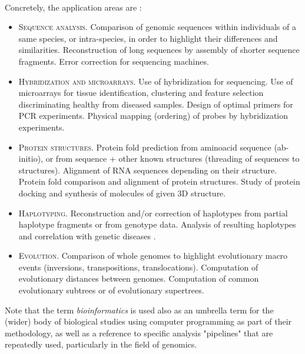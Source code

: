 \paragraph{}
Concretely, the application areas are \cite{a1020100}:
\begin{itemize}
	\item \textsc{Sequence analysis.} Comparison of genomic sequences within individuals of a same species, or intra-species, in order to highlight their differences and similarities. Reconstruction of long sequences by assembly of shorter sequence fragments. Error correction for sequencing machines.
	\item \textsc{Hybridization and microarrays.} Use of hybridization for sequencing. Use of microarrays for tissue identification, clustering and feature selection discriminating healthy from diseased samples. Design of optimal primers for PCR experiments. Physical mapping (ordering) of probes by hybridization experiments.
	\item \textsc{Protein structures.} Protein fold prediction from aminoacid sequence (ab-initio), or from sequence + other known structures (threading of sequences to structures). Alignment of RNA sequences depending on their structure. Protein fold comparison and alignment of protein structures. Study of protein docking and synthesis of molecules of given 3D structure.
	\item \textsc{Haplotyping.} Reconstruction and/or correction of haplotypes from partial haplotype fragments or from genotype data. Analysis of resulting haplotypes and correlation with genetic diseases \cite{Bonizzoni2003}.
	\item \textsc{Evolution.} Comparison of whole genomes to highlight evolutionary macro events (inversions, transpositions, translocations). Computation of evolutionary distances between genomes. Computation of common evolutionary subtrees or of evolutionary supertrees.
\end{itemize}

Note that the term \textit{bioinformatics} is used also as an umbrella term for the (wider) body of biological studies using computer programming as part of their methodology, as well as a reference to specific analysis "pipelines" that are repeatedly used, particularly in the field of genomics.